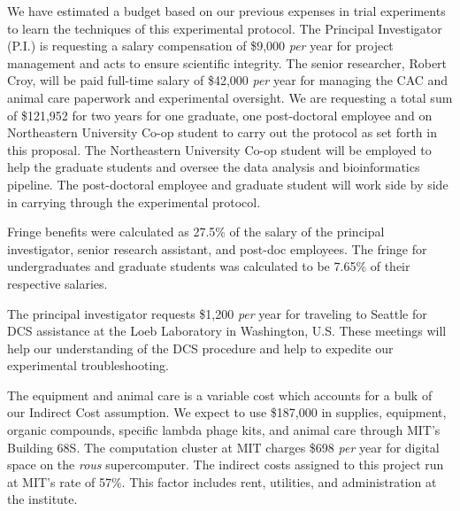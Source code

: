 \documentclass[12pt]{article}
\begin{document}
\vspace{5mm}
We have estimated a budget based on our previous expenses in trial experiments to learn the techniques of this experimental protocol.
The Principal Investigator (P.I.) is requesting a salary compensation of \$9,000 \emph{per} year for project management and acts to ensure scientific integrity.
The senior researcher, Robert Croy, will be paid full-time salary of \$42,000 \emph{per} year for managing the CAC and animal care paperwork and experimental oversight.
We are requesting a total sum of \$121,952 for two years for one graduate, one post-doctoral employee and on Northeastern University Co-op student to carry out the protocol as set forth in this proposal.
The Northeastern University Co-op student will be employed to help the graduate students and oversee the data analysis and bioinformatics pipeline.
The post-doctoral employee and graduate student will work side by side in carrying through the experimental protocol.

Fringe benefits were calculated as 27.5\% of the salary of the principal investigator, senior research assistant, and post-doc employees.
The fringe for undergraduates and graduate students was calculated to be 7.65\% of their respective salaries.

The principal investigator requests \$1,200 \emph{per} year for traveling to Seattle for DCS assistance at the Loeb Laboratory in Washington, U.S.
These meetings will help our understanding of the DCS procedure and help to expedite our experimental troubleshooting.

The equipment and animal care is a variable cost which accounts for a bulk of our Indirect Cost assumption.
We expect to use \$187,000 in supplies, equipment, organic compounds, specific lambda phage kits, and animal care through MIT's Building 68S.
The computation cluster at MIT charges \$698 \emph{per} year for digital space on the \emph{rous} supercomputer.
The indirect costs assigned to this project run at MIT's rate of 57\%.
This factor includes rent, utilities, and administration at the institute.


\newpage

\let\itshape\upshape     %
\singlespacing\centering %


\end{document}
